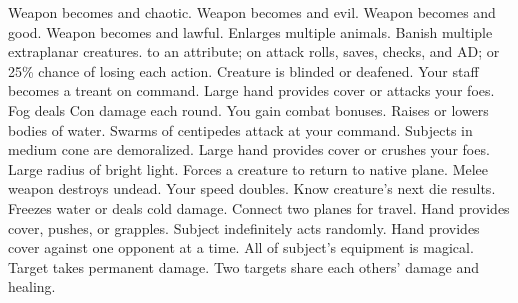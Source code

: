     {Weapon becomes  and chaotic.}
    {Weapon becomes  and evil.}
    {Weapon becomes  and good.}
    {Weapon becomes  and lawful.}
    {Enlarges multiple animals.}
    {Banish multiple extraplanar creatures. }
    { to an attribute;  on attack rolls, saves, checks, and AD; or 25\% chance of losing each action.}
    {Creature is blinded or deafened.}
    {Your staff becomes a treant on command.}
    {Large hand provides cover or attacks your foes.}
    {Fog deals Con damage each round.}
    {You gain combat bonuses.}
    {Raises or lowers bodies of water.}
    {Swarms of centipedes attack at your command.}
    {Subjects in medium cone are demoralized.}
    {Large hand provides cover or crushes your foes.}
    {Large radius of bright light.}
    {Forces a creature to return to native plane.}
    {Melee weapon destroys undead.}
    {Your speed doubles.}
    {Know creature's next die results.}
    {Freezes water or deals cold damage.}
    {Connect two planes for travel.}
    {Hand provides cover, pushes, or grapples.}
    {Subject indefinitely acts randomly.}
    {Hand provides cover against one opponent at a time.}
    {All of subject's equipment is magical.}
    {Target takes permanent damage.}
    {Two targets share each others' damage and healing.}
